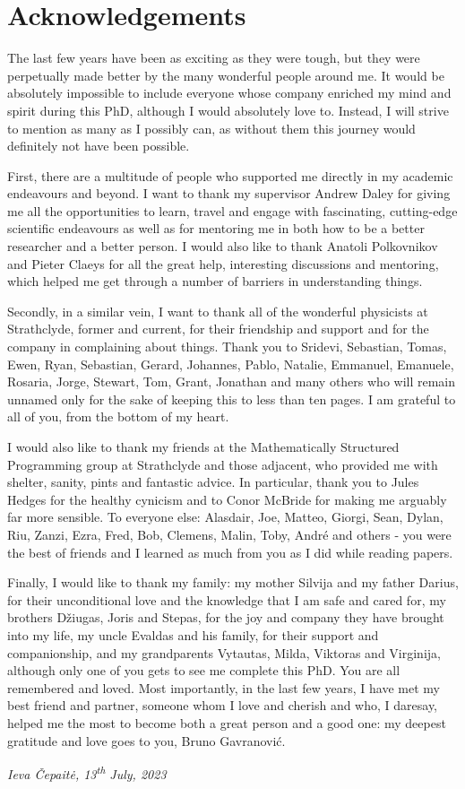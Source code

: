 \chapter{Acknowledgements}

The last few years have been as exciting as they were tough, but they were perpetually made better by the many wonderful people around me. It would be absolutely impossible to include everyone whose company enriched my mind and spirit during this PhD, although I would absolutely love to. Instead, I will strive to mention as many as I possibly can, as without them this journey would definitely not have been possible.

First, there are a multitude of people who supported me directly in my academic endeavours and beyond. I want to thank my supervisor Andrew Daley for giving me all the opportunities to learn, travel and engage with fascinating, cutting-edge scientific endeavours as well as for mentoring me in both how to be a better researcher and a better person. I would also like to thank Anatoli Polkovnikov and Pieter Claeys for all the great help, interesting discussions and mentoring, which helped me get through a number of barriers in understanding things.

Secondly, in a similar vein, I want to thank all of the wonderful physicists at Strathclyde, former and current, for their friendship and support and for the company in complaining about things. Thank you to Sridevi, Sebastian, Tomas, Ewen, Ryan, Sebastian, Gerard, Johannes, Pablo, Natalie, Emmanuel, Emanuele, Rosaria, Jorge, Stewart, Tom, Grant, Jonathan and many others who will remain unnamed only for the sake of keeping this to less than ten pages. I am grateful to all of you, from the bottom of my heart. 

I would also like to thank my friends at the Mathematically Structured Programming group at Strathclyde and those adjacent, who provided me with shelter, sanity, pints and fantastic advice. In particular, thank you to Jules Hedges for the healthy cynicism and to Conor McBride for making me arguably far more sensible. To everyone else: Alasdair, Joe, Matteo, Giorgi, Sean, Dylan, Riu, Zanzi, Ezra, Fred, Bob, Clemens, Malin, Toby, André and others - you were the best of friends and I learned as much from you as I did while reading papers.

Finally, I would like to thank my family: my mother Silvija and my father Darius, for their unconditional love and the knowledge that I am safe and cared for, my brothers Džiugas, Joris and Stepas, for the joy and company they have brought into my life, my uncle Evaldas and his family, for their support and companionship, and my grandparents Vytautas, Milda, Viktoras and Virginija, although only one of you gets to see me complete this PhD. You are all remembered and loved. Most importantly, in the last few years, I have met my best friend and partner, someone whom I love and cherish and who, I daresay, helped me the most to become both a great person and a good one: my deepest gratitude and love goes to you, Bruno Gavranović.

\begin{flushright}
\emph{Ieva \v{C}epait\.{e}, 13\textsuperscript{th} July, 2023}
\end{flushright}